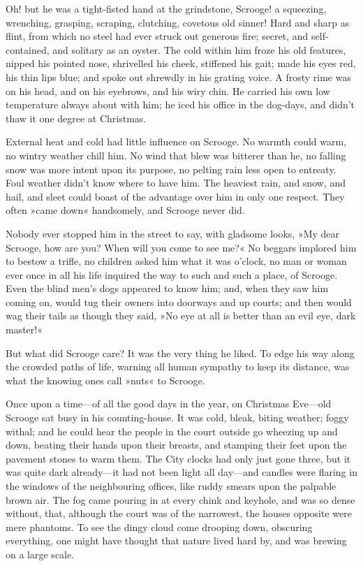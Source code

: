 Oh! but he was a tight-fisted hand at the grindstone, Scrooge! a squeezing, wrenching, grasping, scraping, clutching, covetous old sinner! Hard and sharp as flint, from which no steel had ever struck out generous fire; secret, and self-contained, and solitary as an oyster. The cold within him froze his old features, nipped his pointed nose, shrivelled his cheek, stiffened his gait; made his eyes red, his thin lips blue; and spoke out shrewdly in his grating voice. A frosty rime was on his head, and on his eyebrows, and his wiry chin. He carried his own low temperature always about with him; he iced his office in the dog-days, and didn't thaw it one degree at Christmas.

External heat and cold had little influence on Scrooge. No  warmth could warm, no wintry weather chill him. No wind that blew was bitterer than he, no falling snow was more intent upon its purpose, no pelting rain less open to entreaty. Foul weather didn't know where to have him. The heaviest rain, and snow, and hail, and sleet could boast of the advantage over him in only one respect. They often »came down« handsomely, and Scrooge never did.

Nobody ever stopped him in the street to say, with gladsome looks, »My dear Scrooge, how are you? When will you come to see me?« No beggars implored him to bestow a trifle, no children asked him what it was o'clock, no man or woman ever once in all his life inquired the way to such and such a place, of Scrooge. Even the blind men's dogs appeared to know him; and, when they saw him coming on, would tug their owners into doorways and up courts; and then would wag their tails as though they said, »No eye at all is better than an evil eye, dark master!«

But what did Scrooge care? It was the very thing he liked. To edge his way along the crowded paths of life, warning all human sympathy to keep its distance, was what the knowing ones call »nuts« to Scrooge.

Once upon a time—of all the good days in the year, on Christmas Eve—old Scrooge sat busy in his counting-house. It was cold, bleak, biting weather; foggy withal; and he could hear the people in the court outside go wheezing up and down, beating their hands upon their breasts, and stamping their feet upon the pavement stones to warm them. The City clocks had only just gone three, but it was quite dark already—it had not been light all day—and candles were flaring in the windows of the neighbouring offices, like ruddy smears upon the palpable brown air. The fog came pouring in at every chink and keyhole, and was so dense without, that, although the court was of the narrowest, the houses opposite were mere phantoms. To see the dingy cloud come drooping down, obscuring everything, one might have thought that nature lived hard by, and was brewing on a large scale.

